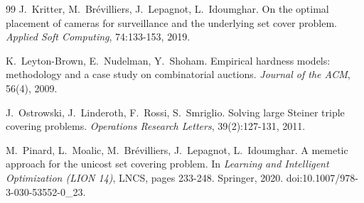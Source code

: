 \documentclass[a4paper,11pt]{article}
\begin{document}
\begin{thebibliography}{99}
 J.~Kritter, M.~Brévilliers, J.~Lepagnot, L.~Idoumghar. On the optimal placement of cameras for surveillance and the underlying set cover problem. \emph{Applied Soft Computing}, 74:133-153, 2019.

 K.~Leyton-Brown, E.~Nudelman, Y.~Shoham. Empirical hardness models: methodology and a case study on combinatorial auctions. \emph{Journal of the ACM}, 56(4), 2009.

 J.~Ostrowski, J.~Linderoth, F.~Rossi, S.~Smriglio. Solving large Steiner triple covering problems. \emph{Operations Research Letters}, 39(2):127-131, 2011.

 M.~Pinard, L.~Moalic, M.~Brévilliers, J.~Lepagnot, L.~Idoumghar. A memetic approach for the unicost set covering problem. In \emph{Learning and Intelligent Optimization (LION 14)}, LNCS, pages 233-248. Springer, 2020. doi:10.1007/978-3-030-53552-0\_23.

\end{thebibliography}
\end{document}
